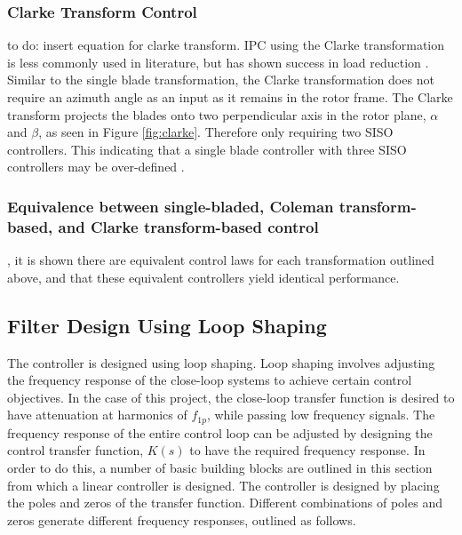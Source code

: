\subsubsection{Clarke Transform Control}
to do: insert equation for clarke transform.
IPC using the Clarke transformation is less commonly used in literature, but has shown success in load reduction \cite{zhang2013proportional}. Similar to the single blade transformation, the Clarke transformation does not require an azimuth angle as an input as it remains in the rotor frame. The Clarke transform projects the blades onto two perpendicular axis in the rotor plane, $\alpha$ and $\beta$, as seen in Figure \ref{fig:clarke}. Therefore only requiring two SISO controllers. This indicating that a single blade controller with three SISO controllers may be over-defined \citep{19_Lio}.

\subsubsection{Equivalence between single-bladed, Coleman transform-based, and Clarke transform-based control}
\citet{20_lio2017fundamental}, it is shown there are equivalent control laws for each transformation outlined above, and that these equivalent controllers yield identical performance. 



\subsection{Filter Design Using Loop Shaping}
The controller is designed using loop shaping. Loop shaping involves adjusting the frequency response of the close-loop systems to achieve certain control objectives. In the case of this project, the close-loop transfer function is desired to have attenuation at harmonics of $f_{1p}$, while passing low frequency signals. The frequency response of the entire control loop can be adjusted by designing the control transfer function, $K(s)$ to have the required frequency response. In order to do this, a number of basic building blocks are outlined in this section from which a linear controller is designed. The controller is designed by placing the poles and zeros of the transfer function. Different combinations of poles and zeros generate different frequency responses, outlined as follows. 
